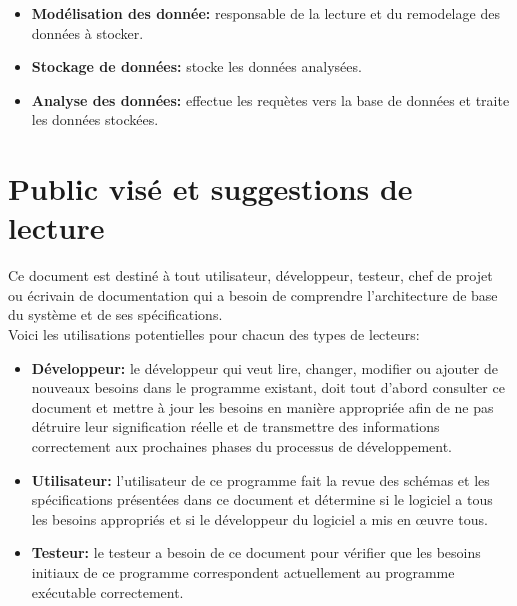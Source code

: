 \documentclass{scrreprt}
\begin{document}
\begin{itemize}
  \item \textbf{Modélisation des donnée:} \- responsable de la lecture et du remodelage des données à stocker.
  \item \textbf{Stockage de données:} \- stocke les données analysées.
  \item \textbf{Analyse des données:} \- effectue les requètes vers la base de données et traite les données stockées.

\end{itemize}


 \section{Public visé et suggestions de lecture}

Ce document est destiné à tout utilisateur, développeur, testeur, chef de projet ou écrivain de documentation qui a besoin de comprendre l'architecture de base du système et de ses spécifications.\\
Voici les utilisations potentielles pour chacun des types de lecteurs:\\
\begin{itemize}

\item \textbf{Développeur: }le développeur qui veut lire, changer, modifier ou ajouter de nouveaux besoins dans le programme existant, doit tout d'abord consulter ce document et mettre à jour les besoins en manière appropriée afin de ne pas détruire leur signification réelle et de transmettre des informations correctement aux prochaines phases du processus de développement.\\

\item \textbf{Utilisateur: }l'utilisateur de ce programme fait la revue des schémas et les spécifications présentées dans ce document et détermine si le logiciel a tous les besoins appropriés et si le développeur du logiciel a mis en œuvre tous.\\

\item \textbf{Testeur: }le testeur a besoin de ce document pour vérifier que les besoins initiaux de ce programme correspondent actuellement  au programme exécutable correctement.\\
\end{itemize}
\end{document}
